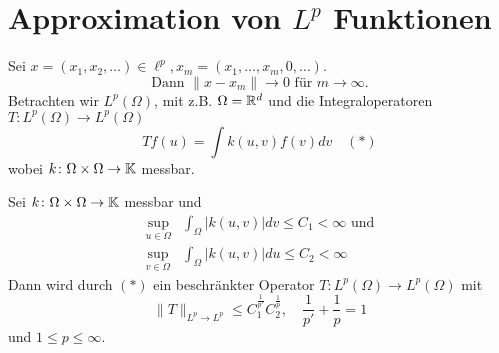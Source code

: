 
\section{Approximation von $L^{p}$ Funktionen}



Sei $x = (x_{1}, x_{2}, \dotsc) \in \ell^{p}, x_{m} = (x_{1}, \dotsc, x_{m}, 0, \dotsc)$.
\[ \text{Dann }\|  x - x_{m} \| \rightarrow 0 \text{ für } m \rightarrow \infty. \]
Betrachten wir $L^{p}(\Omega)$, mit z.B. $\Omega = \mathbb{R}^{d}$ und die Integraloperatoren $T \colon L^{p}(\Omega) \rightarrow L^{p}(\Omega)$
	\[ T f(u) = \int k(u, v) f(v) dv \quad (*) \label{eq:8.0-BeschrOperatorInLp} \]
wobei $k \colon \Omega \times \Omega \rightarrow \mathbb{K}$ messbar.


\begin{satz} \label{satz:8.1}
	Sei $k \colon \Omega \times \Omega \rightarrow \mathbb{K}$ messbar	und
	\begin{align*}
		\sup_{u \in \Omega} & \int_{\Omega} |k(u, v)| dv \leq C_{1} < \infty \text{ und} \\
		\sup_{v \in \Omega} & \int_{\Omega} |k(u, v)| du \leq C_{2} < \infty
	\end{align*}
	Dann wird durch \hyperref[eq:8.0-BeschrOperatorInLp]{$(*)$} ein beschränkter Operator $T \colon L^{p}(\Omega) \rightarrow L^{p}(\Omega)$ mit
	\[ \| T \|_{L^{p} \rightarrow L^{p}} \leq C_{1}^{\frac{1}{p'}} C_{2}^{\frac{1}{p}}, \quad \frac{1}{p'} + \frac{1}{p} = 1   \]
	und $1 \leq p \leq \infty$.
\end{satz}

